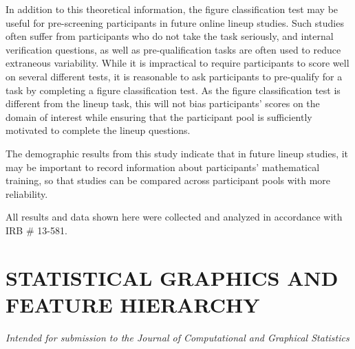 \documentclass[11pt]{isuthesis}\usepackage[]{graphicx}\usepackage[]{color}
\begin{document}
In addition to this theoretical information, the figure classification test may be useful for pre-screening participants in future online lineup studies.
Such studies often suffer from participants who do not take the task seriously, and internal verification questions, as well as pre-qualification tasks are often used to reduce extraneous variability.
While it is impractical to require participants to score well on several different tests, it is reasonable to ask participants to pre-qualify for a task by completing a figure classification test.
As the figure classification test is different from the lineup task, this will not bias participants' scores on the domain of interest while ensuring that the participant pool is sufficiently motivated to complete the lineup questions.

The demographic results from this study indicate that in future lineup studies, it may be important to record information about participants' mathematical training, so that studies can be compared across participant pools with more reliability. 

All results and data shown here were collected and analyzed in accordance with IRB \# 13-581.

\chapter{STATISTICAL GRAPHICS AND FEATURE HIERARCHY}\label{featurehierarchy}


\graphicspath{{Figure/FeatureHierarchy/}{Images/FeatureHierarchy/}}
\renewcommand{\floatpagefraction}{.99}


\noindent\hfil\textit{Intended for submission to the Journal of Computational and Graphical Statistics}\hfil
\end{document}
